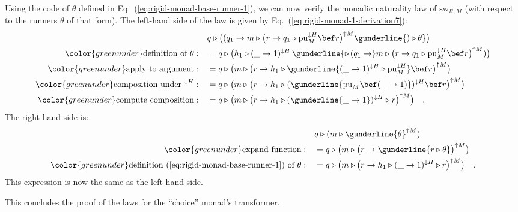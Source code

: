 Using the code of $\theta$ defined in Eq.~(\ref{eq:rigid-monad-base-runner-1}),
we can now verify the monadic naturality law of $\text{sw}_{R,M}$
(with respect to the runners $\theta$ of that form). The left-hand
side of the law is given by Eq.~(\ref{eq:rigid-monad-1-derivation7}):
\begin{align*}
 & q\triangleright\big((q_{1}\rightarrow m\triangleright\big(r\rightarrow q_{1}\triangleright\text{pu}_{M}^{\downarrow H}\bef r\big)^{\uparrow M}\gunderline{)\triangleright\theta}\big)\\
{\color{greenunder}\text{definition of }\theta:}\quad & =q\triangleright\big(h_{1}\triangleright(\_\rightarrow1)^{\downarrow H}\,\gunderline{\triangleright\,(q_{1}\rightarrow}m\triangleright\big(r\rightarrow q_{1}\triangleright\text{pu}_{M}^{\downarrow H}\bef r\big)^{\uparrow M})\big)\\
{\color{greenunder}\text{apply to argument}:}\quad & =q\triangleright\big(m\triangleright\big(r\rightarrow h_{1}\triangleright\gunderline{(\_\rightarrow1)^{\downarrow H}\triangleright\text{pu}_{M}^{\downarrow H}}\bef r\big)^{\uparrow M}\big)\\
{\color{greenunder}\text{composition under }^{\downarrow H}:}\quad & =q\triangleright\big(m\triangleright\big(r\rightarrow h_{1}\triangleright(\gunderline{\text{pu}_{M}\bef(\_\rightarrow1)})^{\downarrow H}\bef r\big)^{\uparrow M}\big)\\
{\color{greenunder}\text{compute composition}:}\quad & =q\triangleright\big(m\triangleright\big(r\rightarrow h_{1}\triangleright(\gunderline{\_\rightarrow1})^{\downarrow H}\triangleright r\big)^{\uparrow M}\big)\quad.
\end{align*}
The right-hand side is:
\begin{align*}
 & q\triangleright(m\triangleright\gunderline{\theta}^{\uparrow M})\\
{\color{greenunder}\text{expand function}:}\quad & =q\triangleright\big(m\triangleright\big(r\rightarrow\gunderline{r\triangleright\theta}\big)^{\uparrow M}\big)\\
{\color{greenunder}\text{definition~(\ref{eq:rigid-monad-base-runner-1}) of }\theta:}\quad & =q\triangleright\big(m\triangleright\big(r\rightarrow h_{1}\triangleright(\_\rightarrow1)^{\downarrow H}\triangleright r\big)^{\uparrow M}\big)\quad.
\end{align*}
This expression is now the same as the left-hand side.

This concludes the proof of the laws for the \textsf{``}choice\textsf{''} monad\textsf{'}s
transformer.

